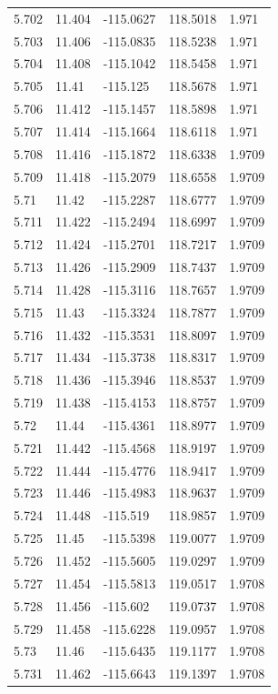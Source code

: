 \begin{tabular}{lllll}
5.702 & 11.404 & -115.0627 & 118.5018 & 1.971 \\
5.703 & 11.406 & -115.0835 & 118.5238 & 1.971 \\
5.704 & 11.408 & -115.1042 & 118.5458 & 1.971 \\
5.705 & 11.41 & -115.125 & 118.5678 & 1.971 \\
5.706 & 11.412 & -115.1457 & 118.5898 & 1.971 \\
5.707 & 11.414 & -115.1664 & 118.6118 & 1.971 \\
5.708 & 11.416 & -115.1872 & 118.6338 & 1.9709 \\
5.709 & 11.418 & -115.2079 & 118.6558 & 1.9709 \\
5.71 & 11.42 & -115.2287 & 118.6777 & 1.9709 \\
5.711 & 11.422 & -115.2494 & 118.6997 & 1.9709 \\
5.712 & 11.424 & -115.2701 & 118.7217 & 1.9709 \\
5.713 & 11.426 & -115.2909 & 118.7437 & 1.9709 \\
5.714 & 11.428 & -115.3116 & 118.7657 & 1.9709 \\
5.715 & 11.43 & -115.3324 & 118.7877 & 1.9709 \\
5.716 & 11.432 & -115.3531 & 118.8097 & 1.9709 \\
5.717 & 11.434 & -115.3738 & 118.8317 & 1.9709 \\
5.718 & 11.436 & -115.3946 & 118.8537 & 1.9709 \\
5.719 & 11.438 & -115.4153 & 118.8757 & 1.9709 \\
5.72 & 11.44 & -115.4361 & 118.8977 & 1.9709 \\
5.721 & 11.442 & -115.4568 & 118.9197 & 1.9709 \\
5.722 & 11.444 & -115.4776 & 118.9417 & 1.9709 \\
5.723 & 11.446 & -115.4983 & 118.9637 & 1.9709 \\
5.724 & 11.448 & -115.519 & 118.9857 & 1.9709 \\
5.725 & 11.45 & -115.5398 & 119.0077 & 1.9709 \\
5.726 & 11.452 & -115.5605 & 119.0297 & 1.9709 \\
5.727 & 11.454 & -115.5813 & 119.0517 & 1.9708 \\
5.728 & 11.456 & -115.602 & 119.0737 & 1.9708 \\
5.729 & 11.458 & -115.6228 & 119.0957 & 1.9708 \\
5.73 & 11.46 & -115.6435 & 119.1177 & 1.9708 \\
5.731 & 11.462 & -115.6643 & 119.1397 & 1.9708 \\

\end{tabular}
